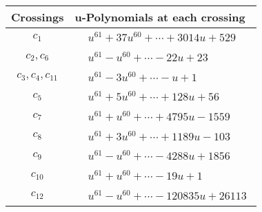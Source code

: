 \documentclass[1p]{elsarticle_modified}
\theoremstyle{definition}
\begin{document}
\begin{tabular}{m{50pt}|m{274pt}}
Crossings & \hspace{64pt}u-Polynomials at each crossing \\
\hline $$\begin{aligned}c_{1}\end{aligned}$$&$\begin{aligned}
&u^{61}+37 u^{60}+\cdots+3014 u+529
\end{aligned}$\\
\hline $$\begin{aligned}c_{2},c_{6}\end{aligned}$$&$\begin{aligned}
&u^{61}- u^{60}+\cdots-22 u+23
\end{aligned}$\\
\hline $$\begin{aligned}c_{3},c_{4},c_{11}\end{aligned}$$&$\begin{aligned}
&u^{61}-3 u^{60}+\cdots- u+1
\end{aligned}$\\
\hline $$\begin{aligned}c_{5}\end{aligned}$$&$\begin{aligned}
&u^{61}+5 u^{60}+\cdots+128 u+56
\end{aligned}$\\
\hline $$\begin{aligned}c_{7}\end{aligned}$$&$\begin{aligned}
&u^{61}+u^{60}+\cdots+4795 u-1559
\end{aligned}$\\
\hline $$\begin{aligned}c_{8}\end{aligned}$$&$\begin{aligned}
&u^{61}+3 u^{60}+\cdots+1189 u-103
\end{aligned}$\\
\hline $$\begin{aligned}c_{9}\end{aligned}$$&$\begin{aligned}
&u^{61}- u^{60}+\cdots-4288 u+1856
\end{aligned}$\\
\hline $$\begin{aligned}c_{10}\end{aligned}$$&$\begin{aligned}
&u^{61}+u^{60}+\cdots-19 u+1
\end{aligned}$\\
\hline $$\begin{aligned}c_{12}\end{aligned}$$&$\begin{aligned}
&u^{61}- u^{60}+\cdots-120835 u+26113
\end{aligned}$\\
\hline
\end{tabular}\\~\\
\end{document}
